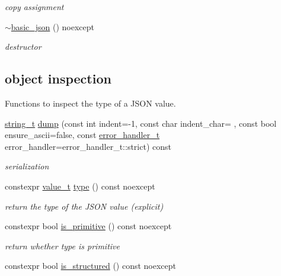 \begin{DoxyCompactItemize}
\begin{DoxyCompactList}\small\item\em copy assignment \end{DoxyCompactList}\item 
\hyperlink{classnlohmann_1_1basic__json_aba01953d5d90e676d504863b8d9fdde5}{$\sim$basic\+\_\+json} () noexcept
\begin{DoxyCompactList}\small\item\em destructor \end{DoxyCompactList}\end{DoxyCompactItemize}
\subsection*{object inspection}
\label{_amgrpbbb01a37b8f261ae5b5799058dcac1a0}%
Functions to inspect the type of a J\+S\+ON value. \begin{DoxyCompactItemize}
\item 
\hyperlink{classnlohmann_1_1basic__json_a61f8566a1a85a424c7266fb531dca005}{string\+\_\+t} \hyperlink{classnlohmann_1_1basic__json_a864a99beff1d81e760c9391688a857be}{dump} (const int indent=-\/1, const char indent\+\_\+char= \textquotesingle{} \textquotesingle{}, const bool ensure\+\_\+ascii=false, const \hyperlink{namespacenlohmann_1_1detail_a5a76b60b26dc8c47256a996d18d967df}{error\+\_\+handler\+\_\+t} error\+\_\+handler=error\+\_\+handler\+\_\+t\+::strict) const 
\begin{DoxyCompactList}\small\item\em serialization \end{DoxyCompactList}\item 
constexpr \hyperlink{namespacenlohmann_1_1detail_a1ed8fc6239da25abcaf681d30ace4985}{value\+\_\+t} \hyperlink{classnlohmann_1_1basic__json_a2b2d781d7f2a4ee41bc0016e931cadf7}{type} () const noexcept
\begin{DoxyCompactList}\small\item\em return the type of the J\+S\+ON value (explicit) \end{DoxyCompactList}\item 
constexpr bool \hyperlink{classnlohmann_1_1basic__json_a6362b88718eb5c6d4fed6a61eed44b95}{is\+\_\+primitive} () const noexcept
\begin{DoxyCompactList}\small\item\em return whether type is primitive \end{DoxyCompactList}\item 
constexpr bool \hyperlink{classnlohmann_1_1basic__json_a9f68a0af820c3ced7f9d17851ce4c22d}{is\+\_\+structured} () const noexcept

\end{DoxyCompactItemize}
